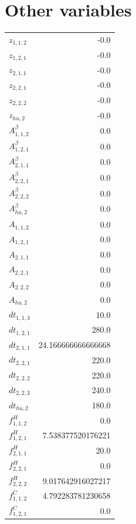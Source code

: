 \documentclass{article}%
\makeatletter
\let\mcnewpage=\newpage%
\newcommand{\TrickSupertabularIntoMulticols}{%
\renewcommand\newpage{%
\if@firstcolumn%
\hrule width\linewidth height0pt%
\columnbreak%
\else%
\mcnewpage%
\fi%
}%
}%
\makeatother
\begin{document}
\section{Other variables}%
\thispagestyle{plain}%
\begin{multicols*}{3}%
\TrickSupertabularIntoMulticols%
%
\begin{supertabular}{lr}%
	$z_{1,1,2}$ & -0.0 \\%
	$z_{1,2,1}$ & -0.0 \\%
	$z_{2,1,1}$ & -0.0 \\%
	$z_{2,2,1}$ & -0.0 \\%
	$z_{2,2,2}$ & -0.0 \\%
	$z_{hu,2}$ & -0.0 \\%
	$A_{1,1,2}^{\beta}$ & 0.0 \\%
	$A_{1,2,1}^{\beta}$ & 0.0 \\%
	$A_{2,1,1}^{\beta}$ & 0.0 \\%
	$A_{2,2,1}^{\beta}$ & 0.0 \\%
	$A_{2,2,2}^{\beta}$ & 0.0 \\%
	$A_{hu,2}^{\beta}$ & 0.0 \\%
	$A_{1,1,2}$ & 0.0 \\%
	$A_{1,2,1}$ & 0.0 \\%
	$A_{2,1,1}$ & 0.0 \\%
	$A_{2,2,1}$ & 0.0 \\%
	$A_{2,2,2}$ & 0.0 \\%
	$A_{hu,2}$ & 0.0 \\%
	$dt_{1,1,3}$ & 10.0 \\%
	$dt_{1,2,1}$ & 280.0 \\%
	$dt_{2,1,1}$ & 24.166666666666668 \\%
	$dt_{2,2,1}$ & 220.0 \\%
	$dt_{2,2,2}$ & 220.0 \\%
	$dt_{2,2,3}$ & 240.0 \\%
	$dt_{hu,2}$ & 180.0 \\%
	$f_{1,1,2}^{H}$ & 0.0 \\%
	$f_{1,2,1}^{H}$ & 7.538377520176221 \\%
	$f_{2,1,1}^{H}$ & 20.0 \\%
	$f_{2,2,1}^{H}$ & 0.0 \\%
	$f_{2,2,2}^{H}$ & 9.017642916027217 \\%
	$f_{1,1,2}^{C}$ & 4.792283781230658 \\%
	$f_{1,2,1}^{C}$ & 0.0 \\%

\end{supertabular}
\end{multicols*}
\end{document}
